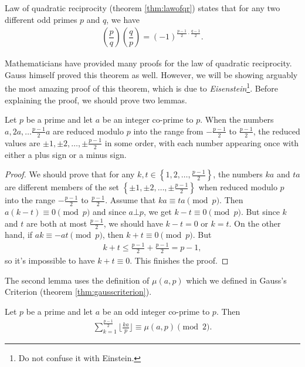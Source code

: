 \documentclass{subfile}
\begin{document}
Law of quadratic reciprocity (theorem \eqref{thm:lawofqr}) states that for any two different odd primes $p$ and $q$, we have
\begin{align*}
\left(\dfrac{p}{q}\right)\left(\dfrac{q}{p}\right)=(-1)^{\frac{p-1}{2}\cdot \frac{q-1}{2}}.
\end{align*}

Mathematicians have provided many proofs for the law of quadratic reciprocity. Gauss himself proved this theorem as well. However, we will be showing arguably the most amazing proof of this theorem, which is due to \textit{Eisenstein}\footnote{Do not confuse it with Einstein.}. 
Before explaining the proof, we should prove two lemmas.

\begin{lemma}\label{lem:lawofqrlem1}
	Let $p$ be a prime and let $a$ be an integer co-prime to $p$. When the numbers $a, 2a, \ldots \frac{p-1}{2}a$ are reduced modulo $p$ into the range from $-\frac{p-1}{2}$ to $\frac{p-1}{2}$, the reduced values are $\pm 1, \pm 2, \dots, \pm \frac{p-1}{2}$ in some order, with each number appearing once with either a plus sign or a minus sign.
\end{lemma}

\begin{proof}\label{lem:lawofqrlem2}
	We should prove that for any $k, t \in \left\{1, 2, \dots, \frac{p-1}{2}\right\}$, the numbers $ka$ and $ta$ are different members of the set $\left\{ \pm 1, \pm 2, \dots, \pm \frac{p-1}{2} \right\}$ when reduced modulo $p$ into the range $-\frac{p-1}{2}$ to $\frac{p-1}{2}$. Assume that $ka \equiv ta \pmod p$. Then $a(k-t) \equiv 0 \pmod p$ and since $a \bot p$, we get $k-t \equiv 0 \pmod p$. But since $k$ and $t$ are both at most $\frac{p-1}{2}$, we should have $k-t=0$ or $k=t$. On the other hand, if $ak \equiv -at \pmod p$, then $k+t \equiv 0 \pmod p$. But
	\begin{align*}
	k+t \leq \frac{p-1}{2} + \frac{p-1}{2} = p-1,
	\end{align*}
	so it's impossible to have $k+t \equiv 0$. This finishes the proof.
\end{proof}

The second lemma uses the definition of $\mu(a,p)$ which we defined in Gauss's Criterion (theorem \eqref{thm:gausscriterion}).

\begin{lemma}
	Let $p$ be a prime and let $a$ be an odd integer co-prime to $p$. Then
	\begin{align*}
	\displaystyle \sum_{k=1}^{\frac{p-1}{2}} \Big\lfloor\frac{ka}{p} \Big\rfloor \equiv \mu(a,p) \pmod 2.
	\end{align*}
\end{lemma}
\end{document}
